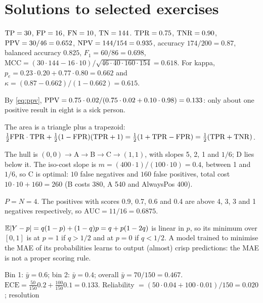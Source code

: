 \section*{Solutions to selected exercises}

\begin{description}[font=\bfseries,leftmargin=0pt,itemsep=5pt]
  \item[\ref{exr:confusion}] $\mathrm{TP}=30$, $\mathrm{FP}=16$, $\mathrm{FN}=10$, $\mathrm{TN}=144$. $\mathrm{TPR}=0.75$,
        $\mathrm{TNR}=0.90$, $\mathrm{PPV}=30/46=0.652$, $\mathrm{NPV}=144/154=0.935$, accuracy $174/200=0.87$, balanced
        accuracy $0.825$, $F_1=60/86=0.698$,
        $\mathrm{MCC}=(30\cdot144-16\cdot10)/\sqrt{46\cdot40\cdot160\cdot154}=0.618$. For kappa,
        $p_e=0.23\cdot0.20+0.77\cdot0.80=0.662$ and $\kappa=(0.87-0.662)/(1-0.662)=0.615$.
  \item[\ref{exr:ppv}] By \cref{eq:ppv}, $\mathrm{PPV}=0.75\cdot0.02/(0.75\cdot0.02+0.10\cdot0.98)=0.133$:
        only about one positive result in eight is a sick person.
  \item[\ref{exr:aucba}] The area is a triangle plus a trapezoid:
        $\frac12\mathrm{FPR}\cdot\mathrm{TPR}+\frac12(1-\mathrm{FPR})(\mathrm{TPR}+1)=\frac12(1+\mathrm{TPR}-\mathrm{FPR})=\frac12(\mathrm{TPR}+\mathrm{TNR})$.
  \item[\ref{exr:hull}] The hull is $(0,0)\to$A$\to$B$\to$C$\to(1,1)$, with slopes 5, 2, 1 and
        $1/6$; D lies below it. The iso-cost slope is $m=(400\cdot1)/(100\cdot10)=0.4$, between
        1 and $1/6$, so C is optimal: $10$ false negatives and $160$ false positives, total cost
        $10\cdot10+160=260$ (B costs 380, A 540 and AlwaysPos 400).
  \item[\ref{exr:roc}] $P=N=4$. The positives with scores 0.9, 0.7, 0.6 and 0.4 are above 4, 3, 3
        and 1 negatives respectively, so $\mathrm{AUC}=11/16=0.6875$.
  \item[\ref{exr:proper}] $\mathbb{E}|Y-p|=q(1-p)+(1-q)p=q+p(1-2q)$ is linear in $p$, so its minimum over
        $[0,1]$ is at $p=1$ if $q>1/2$ and at $p=0$ if $q<1/2$. A model trained to minimise the
        MAE of its probabilities learns to output (almost) crisp predictions: the MAE is not a
        proper scoring rule.
  \item[\ref{exr:calib}] Bin 1: $\bar y=0.6$; bin 2: $\bar y=0.4$; overall $\bar y=70/150=0.467$.
        $\mathrm{ECE}=\frac{50}{150}0.2+\frac{100}{150}0.1=0.133$. Reliability
        $=(50\cdot0.04+100\cdot0.01)/150=0.020$; resolution

\end{description}
